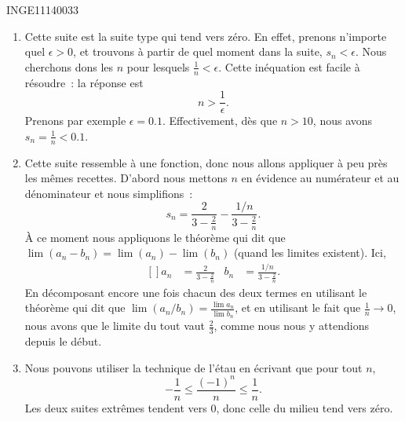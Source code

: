 \documentclass{article}
\begin{document}
\begin{corrige}{INGE11140033}

	\begin{enumerate}

		\item
			Cette suite est la suite type qui tend vers zéro. En effet, prenons n'importe quel $\epsilon>0$, et trouvons à partir de quel moment dans la suite, $s_n<\epsilon$. Nous cherchons dons les $n$ pour lesquels $\frac{1}{ n }<\epsilon$. Cette inéquation est facile à résoudre~: la réponse est
			\begin{equation}
				n>\frac{1}{ \epsilon }.
			\end{equation}
			Prenons par exemple $\epsilon=0.1$. Effectivement, dès que $n>10$, nous avons $s_n=\frac{1}{ n }<0.1$.

		\item
			Cette suite ressemble à une fonction, donc nous allons appliquer à peu près les mêmes recettes. D'abord nous mettons $n$ en évidence au numérateur et au dénominateur et nous simplifions~:
			\begin{equation}
				s_n=\frac{ 2 }{ 3-\frac{ 2 }{ n } }-\frac{ 1/n }{ 3-\frac{ 2 }{ n } }.
			\end{equation}
			À ce moment nous appliquons le théorème qui dit que $\lim(a_n-b_n)=\lim(a_n)-\lim(b_n)$ (quand les limites existent). Ici,
			\begin{equation}
				\begin{aligned}[]
					a_n&=\frac{ 2 }{ 3-\frac{ 2 }{ n } } & b_n&=\frac{ 1/n }{ 3-\frac{ 2 }{ n } }.
				\end{aligned}
			\end{equation}
			En décomposant encore une fois chacun des deux termes en utilisant le théorème qui dit que $\lim(a_n/b_n)=\frac{ \lim a_n }{ \lim b_n }$, et en utilisant le fait que $\frac{1}{ n }\to 0$, nous avons que le limite du tout vaut $\frac{ 2 }{ 3 }$, comme nous nous y attendions depuis le début.

		\item
			Nous pouvons utiliser la technique de l'étau en écrivant que pour tout $n$,
			\begin{equation}
				-\frac{1}{ n }\leq \frac{ (-1)^n }{ n }\leq \frac{1}{ n }.
			\end{equation}
			Les deux suites extrêmes tendent vers $0$, donc celle du milieu tend vers zéro.

	\end{enumerate}

\end{corrige}
\end{document}
